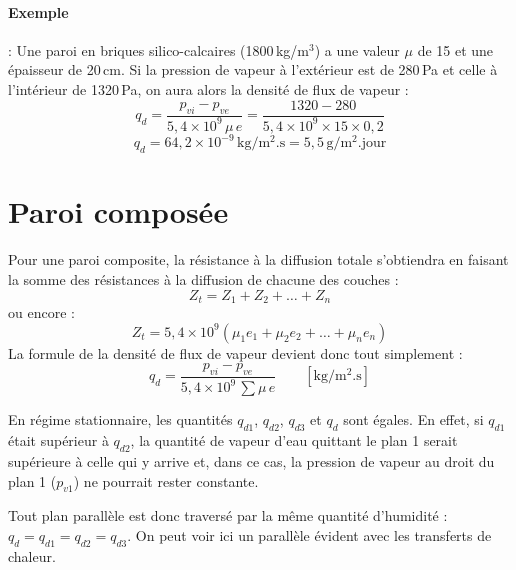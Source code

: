 \paragraph{Exemple} : Une paroi en briques silico-calcaires (1800\,kg/m$^3$) a une valeur $\mu$ de 15 et une épaisseur de 20\,cm. Si la pression de vapeur à l'extérieur est de 280\,Pa et celle à l'intérieur de 1320\,Pa, on aura alors la densité de flux de vapeur :
\begin{equation}
  q_d = \frac{p_{vi} - p_{ve}}{5{,}4\times10^{9}\,\mu\,e}
      = \frac{1320 - 280}{5{,}4\times10^{9}\times 15\times 0{,}2}
\end{equation}
\begin{equation}
  q_d = 64{,}2\times10^{-9}\,\mathrm{kg/m^2.s} = 5{,}5\,\mathrm{g/m^2.jour}
\end{equation}

\section{Paroi composée}
Pour une paroi composite, la résistance à la diffusion totale s'obtiendra en faisant la somme des résistances à la diffusion de chacune des couches :
\begin{equation}
  Z_t = Z_1 + Z_2 + \dots + Z_n
\end{equation}
ou encore :
\begin{equation}
  Z_t = 5{,}4\times10^{9}\left(\mu_1 e_1 + \mu_2 e_2 + \dots + \mu_n e_n\right)
\end{equation}
La formule de la densité de flux de vapeur devient donc tout simplement :
\begin{equation}
  q_d = \frac{p_{vi} - p_{ve}}{5{,}4\times10^{9}\,\sum \mu\,e} \qquad \mathrm{[kg/m^2.s]}
\end{equation}

En régime stationnaire, les quantités $q_{d1}$, $q_{d2}$, $q_{d3}$ et $q_d$ sont égales.
En effet, si $q_{d1}$ était supérieur à $q_{d2}$, la quantité de vapeur d'eau quittant le plan 1 serait supérieure à celle qui y arrive et, dans ce cas, la pression de vapeur au droit du plan 1 ($p_{v1}$) ne pourrait rester constante.

Tout plan parallèle est donc traversé par la même quantité d'humidité : $q_d = q_{d1} = q_{d2} = q_{d3}$.
On peut voir ici un parallèle évident avec les transferts de chaleur.

